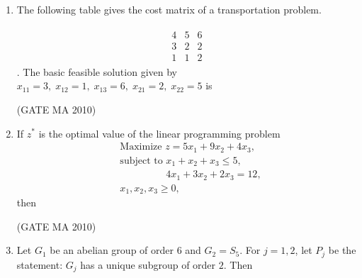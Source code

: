 \documentclass[journal,12pt,onecolumn]{IEEEtran}
\theoremstyle{remark}
\begin{document}
\begin{flushleft}
\begin{enumerate}
\item The following table gives the cost matrix of a transportation problem. 

\begin{align*}
\begin{array}{|c|c|c|c|}
4 & 5 & 6 \\
\hline
3 & 2 & 2 \\
\hline
1 & 1 & 2
\end{array}
\end{align*}
.
The basic feasible solution given by $x_{11}=3,\;x_{12}=1,\;x_{13}=6,\;x_{21}=2,\;x_{22}=5$ is \underline{\hspace{2cm}}

\hfill(GATE MA 2010)

\begin{enumerate}
\end{enumerate}
\item If $z^*$ is the optimal value of the linear programming problem
\begin{align*}
&\text{Maximize } z=5x_1+9x_2+4x_3,\\
&\text{subject to } x_1+x_2+x_3\le 5,\\
&\phantom{\text{subject to }} 4x_1+3x_2+2x_3=12,\\
& x_1,x_2,x_3\ge 0,
\end{align*}
then

\hfill(GATE MA 2010)

\begin{enumerate}
\end{enumerate}

\item Let $G_1$ be an abelian group of order $6$ and $G_2=S_5$. For $j=1,2$, let $P_j$ be the statement: $G_j$ has a unique subgroup of order $2$. Then


\end{enumerate}
\end{flushleft}
\end{document}
